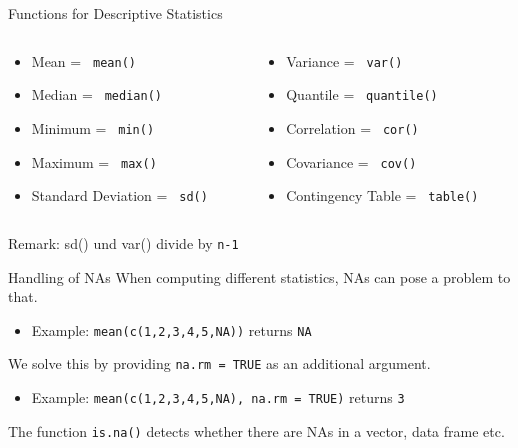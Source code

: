 \documentclass[xcolor=dvipsnames, aspectratio = 169]{beamer}
\begin{document}
\begin{frame}[fragile]{Functions for Descriptive Statistics}
\begin{columns}[T]
	\begin{column}{0.5\textwidth}
		\begin{itemize}
			\item Mean = \verb+ mean() +
			\item Median = \verb+ median() +
			\item Minimum = \verb+ min() +
			\item Maximum = \verb+ max() +
			\item Standard Deviation = \verb+ sd() +
		\end{itemize}
	\end{column}
	\begin{column}{0.5\textwidth}
		\begin{itemize}
			\item Variance = \verb+ var() +
			\item Quantile = \verb+ quantile() +
			\item Correlation = \verb+ cor() +
			\item Covariance = \verb+ cov() +
			\item Contingency Table = \verb+ table() +
		\end{itemize}
	\end{column}
\end{columns}
Remark: sd() und var() divide by \verb+n-1+
\end{frame}

\begin{frame}[fragile]{Handling of NAs}
	When computing different statistics, NAs can pose a problem to that.\\
	\begin{itemize}
			\item Example: \verb+mean(c(1,2,3,4,5,NA))+ returns \verb+NA+\\
	\end{itemize}
	We solve this by providing \verb+na.rm = TRUE+ as an additional argument.\\
	\begin{itemize}
			\item Example: \verb+mean(c(1,2,3,4,5,NA), na.rm = TRUE)+ returns \verb+3+
	\end{itemize}
	The function \verb+is.na()+ detects whether there are NAs in a vector, data frame etc.
\end{frame}

\end{document}
